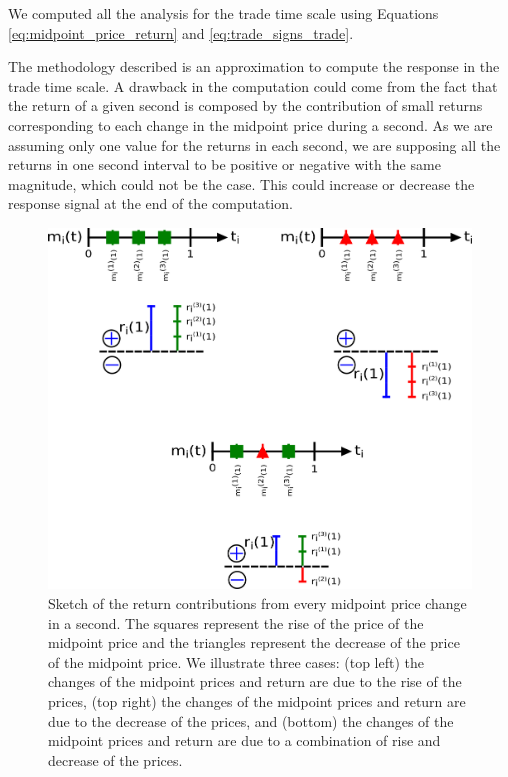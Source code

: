We computed all the analysis for the trade time scale using Equations
\ref{eq:midpoint_price_return} and \ref{eq:trade_signs_trade}.

The methodology described is an approximation to compute the response in the
trade time scale. A drawback in the computation could come from the fact that
the return of a given second is composed by the contribution of small returns
corresponding to each change in the midpoint price during a second. As we are
assuming only one value for the returns in each second, we are supposing  all
the returns in one second interval to be positive or negative with the same
magnitude, which could not be the case. This could increase or decrease the
response signal at the end of the computation.

\begin{figure}[htbp]
    \centering
    \includegraphics[width=\columnwidth]{figures/02_return_contributions.png}
    \caption{Sketch of the return contributions from every midpoint price
             change in a second. The squares represent the rise of the price of
             the midpoint price and the triangles represent the decrease of the
             price of the midpoint price. We illustrate three cases: (top left)
             the changes of the midpoint prices and return are due to the rise
             of the prices, (top right) the changes of the midpoint prices and
             return are due to the decrease of the prices, and (bottom) the
             changes of the midpoint prices and return are due to a combination
             of rise and decrease of the prices.}
    \label{fig:return_contributions}
\end{figure}

